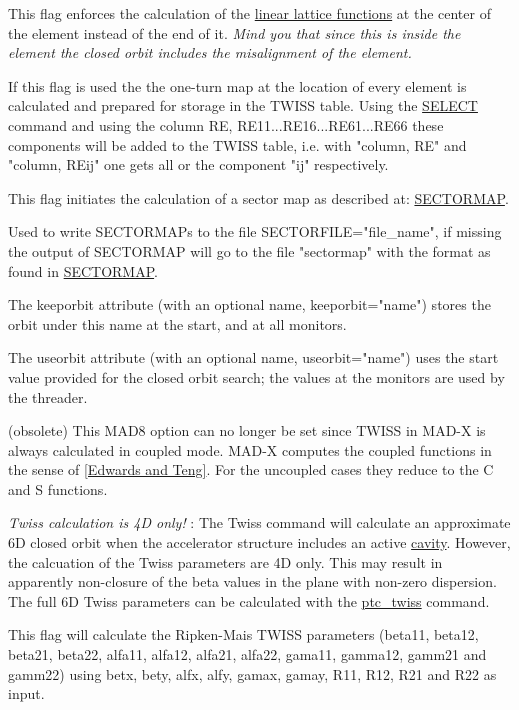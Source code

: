 \begin{madlist}
    This flag enforces the calculation of the
     \href{../Introduction/tables.html#linear}{linear lattice
       functions} at the center of the element instead of the end
     of it. \textit{ Mind you that since this is inside the element
       the closed orbit includes the misalignment of the element.} 

    If this flag is used the the one-turn map at the
     location of every element is calculated and prepared for
     storage in the TWISS table. Using the
     \href{../Introduction/select.html}{SELECT} command and using
     the column RE, RE11...RE16...RE61...RE66 these components will
     be added to the TWISS table, i.e. with "column, RE" and
     "column, REij" one gets all or the component "ij"
     respectively.    

    This flag initiates the calculation of a sector
     map as described at:
     \href{../Introduction/sectormap.html}{SECTORMAP}.    

    Used to write SECTORMAPs to the file
     SECTORFILE="file\_name", if missing the output of SECTORMAP
     will go to the file "sectormap" with the format as found in
     \href{../Introduction/sectormap.html}{SECTORMAP}.    

    The keeporbit attribute (with an optional name,
     keeporbit="name") stores the orbit under this name at the
     start, and at all monitors.    

    The useorbit attribute (with an optional name,
     useorbit="name") uses the start value provided for the closed
     orbit search; the values at the monitors are used by the
     threader.    

    (obsolete) This MAD8 option can no
     longer be set since TWISS in MAD-X is always calculated in
     coupled mode. MAD-X computes the coupled functions in the
     sense of
     \href{../Introduction/bibliography.html#edwards}{[Edwards and
         Teng]}. For the uncoupled cases they reduce to the C and S
     functions.    

     \textit{ Twiss calculation is 4D only!} : The Twiss
     command will calculate an approximate 6D closed orbit when the
     accelerator structure includes an active
     \href{../Introduction/cavity.html}{cavity}. However, the
     calcuation of the Twiss parameters are 4D only. This may
     result in apparently non-closure of the beta values in the
     plane with non-zero dispersion. The full 6D Twiss parameters
     can be calculated with the
     \href{../ptc_twiss/ptc_twiss.html}{ptc\_twiss} command.    

    This flag will calculate the Ripken-Mais TWISS
     parameters (beta11, beta12, beta21, beta22, alfa11, alfa12,
     alfa21, alfa22, gama11, gamma12, gamm21 and gamm22) using
     betx, bety, alfx, alfy, gamax, gamay, R11, R12, R21 and R22 as
     input.  

\end{madlist}

